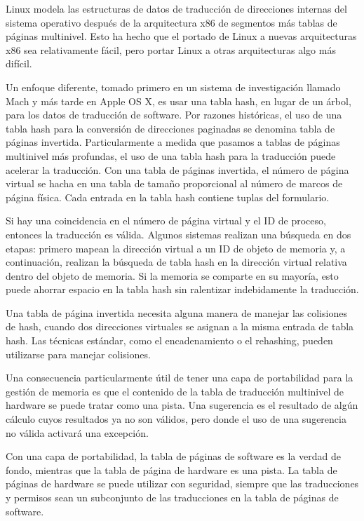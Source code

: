 \documentclass[10pt]{book}
\begin{document}
Linux modela las estructuras de datos de traducción de direcciones internas del sistema operativo después de la arquitectura x86 de segmentos más tablas de páginas multinivel. Esto ha hecho que el portado de Linux a nuevas arquitecturas x86 sea relativamente fácil, pero portar Linux a otras arquitecturas algo más difícil.

Un enfoque diferente, tomado primero en un sistema de investigación llamado Mach y más tarde en Apple OS X, es usar una tabla hash, en lugar de un árbol, para los datos de traducción de software. Por razones históricas, el uso de una tabla hash para la conversión de direcciones paginadas se denomina tabla de páginas invertida. Particularmente a medida que pasamos a tablas de páginas multinivel más profundas, el uso de una tabla hash para la traducción puede acelerar la traducción. Con una tabla de páginas invertida, el número de página virtual se hacha en una tabla de tamaño proporcional al número de marcos de página física. Cada entrada en la tabla hash contiene tuplas del formulario.

Si hay una coincidencia en el número de página virtual y el ID de proceso, entonces la traducción es válida. Algunos sistemas realizan una búsqueda en dos etapas: primero mapean la dirección virtual a un ID de objeto de memoria y, a continuación, realizan la búsqueda de tabla hash en la dirección virtual relativa dentro del objeto de memoria. Si la memoria se comparte en su mayoría, esto puede ahorrar espacio en la tabla hash sin ralentizar indebidamente la traducción.

Una tabla de página invertida necesita alguna manera de manejar las colisiones de hash, cuando dos direcciones virtuales se asignan a la misma entrada de tabla hash. Las técnicas estándar, como el encadenamiento o el rehashing, pueden utilizarse para manejar colisiones.

Una consecuencia particularmente útil de tener una capa de portabilidad para la gestión de memoria es que el contenido de la tabla de traducción multinivel de hardware se puede tratar como una pista. Una sugerencia es el resultado de algún cálculo cuyos resultados ya no son válidos, pero donde el uso de una sugerencia no válida activará una excepción.

Con una capa de portabilidad, la tabla de páginas de software es la verdad de fondo, mientras que la tabla de página de hardware es una pista. La tabla de páginas de hardware se puede utilizar con seguridad, siempre que las traducciones y permisos sean un subconjunto de las traducciones en la tabla de páginas de software.
\end{document}
